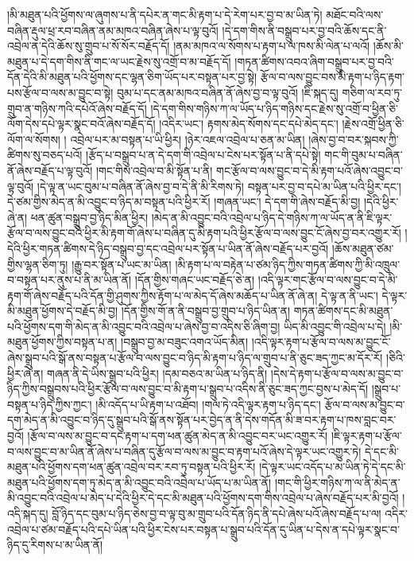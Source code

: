 །མི་མཐུན་པའི་ཕྱོགས་ལ་ཞུགས་པ་ནི་དཔེར་ན་གང་མི་རྟག་པ་དེ་རེག་པར་བྱ་བ་མ་ཡིན་ཏེ། མཐོང་བའི་ལས་བཞིན་རྡུལ་ཕྲ་རབ་བཞིན་ནམ་མཁའ་བཞིན་ཞེས་པ་ལྟ་བུའོ། །དེ་དག་གིས་ནི་བསྒྲུབ་པར་བྱ་བའི་ཆོས་དང་ནི་འབྲེལ་ན་དེའི་ཆོས་སུ་གྲུབ་པ་སོ་སོར་བརྗོད་དོ། །ནམ་མཁའ་ལ་སོགས་པ་རྟག་པ་ལ་ཁས་མི་ལེན་པ་ལའོ། །ཆོས་མི་མཐུན་པ་དེ་དག་གིས་ནི་གང་ལ་ཡང་རྗེས་སུ་འགྲོ་བ་མ་བརྗོད་དོ། །གཏན་ཚིགས་འབའ་ཞིག་བསྒྲུབ་པར་བྱ་བའི་དོན་དེའི་མི་མཐུན་པའི་ཕྱོགས་དང་ལྷན་ཅིག་ཡོད་པར་བསྟན་པར་བྱ་སྟེ། རྩོལ་བ་ལས་བྱུང་བས་མི་རྟག་པ་ཉིད་རྟག་པས་རྩོལ་བ་ལས་མ་བྱུང་བ་སྟེ། བུམ་པ་དང་ནམ་མཁའ་བཞིན་ནོ་ཞེས་བྱ་བ་ལྟ་བུའོ། །ཇི་སྐད་དུ། གཅིག་ལ་རབ་ཏུ་གྲུབ་ན་གཉིས་ཀའི་དཔེའོ་ཞེས་བརྗོད་དོ། །དེ་དག་གིས་གཉིས་ཀ་ལ་ཡོད་པ་ཉིད་གཉིས་དང་རྗེས་སུ་འགྲོ་བ་ཕྱིན་ཅི་ལོག་དེས་དཔེ་ལྟར་སྣང་བའོ་ཞེས་བརྗོད་དོ། །འདིར་ཡང་། རྟགས་མེད་སོགས་དང་དཔེ་མེད་དང་། །རྗེས་འགྲོ་ཕྱིན་ཅི་ལོག་ལ་སོགས། །
འབྲེལ་པར་མ་བསྟན་པ་ཡི་ཕྱིར། །ཉེར་འཇལ་འབྲེལ་པ་ཅན་མ་ཡིན། །ཞེས་བྱ་བ་བར་སྐབས་ཀྱི་ཚིགས་སུ་བཅད་པའོ། །རྩོད་པ་བསྒྲུབ་པ་ན་དེ་དག་གི་འབྲེལ་པ་ངེས་པར་སྟོན་པ་ནི་དཔེ་སྟེ། གང་གི་བུམ་པ་བཞིན་ནོ་ཞེས་བརྗོད་པ་ལྟ་བུའོ། །གང་གིས་འབྲེལ་བ་མི་སྟོན་པ་ནི། གང་རྩོལ་བ་ལས་བྱུང་བ་དེ་མི་རྟག་པའོ་ཞེས་འབྱུང་བ་ལྟ་བུའོ། །དེ་ལྟ་ན་ཡང་བུམ་པ་བཞིན་ནོ་ཞེས་བྱ་བ་དེ་ནི་མི་རིགས་ཏེ། བསྟན་པར་བྱ་བ་དཔེ་མ་ཡིན་པའི་ཕྱིར་དང་། དེ་ཙམ་གྱིས་མེད་ན་མི་འབྱུང་བ་ཉིད་མ་བསྟན་པའི་ཕྱིར་རོ། །གཞན་ཡང་། དེ་དག་གི་ཞེས་བརྗོད་མི་བྱ། །དེའི་ཕྱིར་ཞེ་ན། ཕན་ཚུན་བསྒྲུབ་བྱ་ཉིད་མིན་ཕྱིར། །མེད་ན་མི་འབྱུང་བའི་འབྲེལ་པ་ཉིད་དེ་གཉིས་ཀ་ལ་ཡོད་ན་ནི་ཇི་ལྟར་རྩོལ་བ་ལས་བྱུང་བའི་ཕྱིར་མི་རྟག་གོ་ཞེས་པ་བཞིན་དུ་མི་རྟག་པའི་ཕྱིར་རྩོལ་བ་ལས་བྱུང་ངོ་ཞེས་བྱ་བར་འགྱུར་རོ། །དེའི་ཕྱིར་གཏན་ཚིགས་དེ་ཉིད་བསྒྲུབ་བྱ་དང་འབྲེལ་པར་སྟོན་པ་ཡིན་ནོ་ཞེས་བརྗོད་པར་བྱའོ། །ཆོས་མཐུན་ཙམ་གྱིས་ལྷན་ཅིག་ཏུ། །རྒྱུ་བར་སྟོན་པ་ཡང་མ་ཡིན། །མི་རྟག་པ་ལ་བརྟེན་པ་ཙམ་ཉིད་ཀྱིས་གཏན་ཚིགས་ཀྱི་མི་འཁྲུལ་བ་བསྟན་པར་ནུས་པ་ནི་མ་ཡིན་ནོ། །དོན་གྱིས་གཞང་ཡང་བརྗོད་ཅེ་ན། །འདི་ལྟར་གང་རྩོལ་བ་ལས་བྱུང་བ་དེ་མི་རྟག་གོ་ཞེས་བརྗོད་པའི་དོན་གྱི་ཤུགས་ཀྱིས་རྟོག་པ་ལ་མེད་དོ་ཞེས་མཆོད་པ་ཡིན་ནོ་ཞེ་ན། དེ་ལྟ་ན་ནི་ཡང་། དེ་ལྟར་མི་མཐུན་ཕྱོགས་དེ་བརྗོད་མི་བྱ། །དོན་གྱིས་གོ་ན་ནི་བསྒྲུབ་བྱ་གྲུབ་པ་ཉིད་ཡིན་ན། གཏན་ཚིགས་དང་མི་མཐུན་པའི་ཕྱོགས་དག་གི་མེད་ན་མི་འབྱུང་བའི་འབྲེལ་པ་ཞེས་བྱ་བ་འདིས་ཅི་ཞིག་བྱ། ཡིད་མི་འབྱུང་གི་འབྲེལ་པ་དེ། །མི་མཐུན་ཕྱོགས་ཀྱིས་བསྟན་པ་ན། །བསྒྲུབ་བྱ་མ་བཟུང་འགའ་ཡོད་མིན། །འདི་ལྟར་རྟག་པ་རྩོལ་བ་ལས་མ་བྱུང་ངོ་ཞེས་སྒྲུབ་པའི་སྒོ་ནས་བསྟན་པ་རྩོལ་བ་ལས་བྱུང་བ་ཉིད་མི་རྟག་པ་ཉིད་ལ་གྲུབ་པ་ནི་ཅུང་ཟད་ཀྱང་མ་དོར་རོ། །ཅིའི་ཕྱིར་ཞེ་ན། གཞན་ནི་དེ་ཡིས་སྒྲུབ་པའི་ཕྱིར། །དམ་བཅའ་མ་ཡིན་པ་ཉིད་ནི། །དེས་དེ་རྟག་པ་རྩོལ་བ་ལས་མ་བྱུང་བ་ཉིད་ཀྱིས་བསྒྲུབས་པའི་ཕྱིར་རྩོལ་བ་ལས་བྱུང་བ་མི་རྟག་པ་སྒྲུབ་པ་འདིས་ནི་ཅུང་ཟད་ཀྱང་བྱས་པ་མེད་དོ། །སྒྲུབ་པ་བསྟན་པ་ཉིད་ཀྱིས་ཀྱང་། །མི་འདོད་པ་ཡི་རྟག་པ་འཐོབ། །གལ་ཏེ་འདི་ལྟར་རྟག་པ་ཉིད་དང་། རྩོལ་བ་ལས་མ་བྱུང་བ་དག་མེད་ན་མི་འབྱུང་བ་ཉིད་དུ་སྒྲུབ་པའི་སྒོ་ནས་སྟོན་པར་བྱེད་ན་ནི་དེས་གདོན་མི་ཟ་བར་རྟག་པ་ཁས་བླང་བར་བྱའོ། །རྩོལ་བ་ལས་མ་བྱུང་བ་དང་རྟག་པ་དག་ཕན་ཚུན་མེད་ན་མི་འབྱུང་བར་ཡང་འགྱུར་རོ། །ཇི་ལྟར་རྟག་པ་རྩོལ་བ་ལས་བྱུང་བ་མ་ཡིན་ནོ་ཞེས་པ་བཞིན་དུ་རྩོལ་བ་ལས་མ་བྱུང་བ་རྟག་པའོ་ཞེས་དེ་ལྟར་ཡང་འགྱུར་ཏེ། དེ་དང་མི་མཐུན་པའི་ཕྱོགས་དག་ཕན་ཚུན་འབྲེལ་བར་རབ་ཏུ་བསྟན་པའི་ཕྱིར་རོ། །དེ་ལྟར་ཡང་འདོད་པ་མ་ཡིན་ཏེ་དེ་དང་མི་མཐུན་པའི་ཕྱོགས་དག་ཏུ་མེད་ན་མི་འབྱུང་བའི་འབྲེལ་པ་ཡོད་པ་མ་ཡིན་ནོ། །གང་གི་ཕྱིར་གཉིས་ཀ་ལ་ནི་མེད་ན་མི་འབྱུང་བའི་འབྲེལ་པ་མེད་པ་དེའི་ཕྱིར་དེ་དང་མི་མཐུན་པའི་ཕྱོགས་དག་གིས་འབྲེལ་པ་ཞེས་བརྗོད་པར་མི་བྱའོ། །འདི་སྐད་དུ། བློ་ཉིད་དང་བུམ་པ་ཉིད་ཅེས་བྱ་བ་ལྟ་བུ་མ་གྲུབ་པའི་དོན་ཉིད་ནི་དཔེ་ཞེས་པའོ་ཞེས་བརྗོད་པ་ལ། འདིར་འབྲེལ་པ་ཙམ་བརྗོད་པའི་དཔེ་ཡིན་པའི་ཕྱིར་ངེས་པར་བསྟན་པ་སྒྲུབ་པའི་དོན་དུ་ཡིན་པ་དེས་ན་དཔེ་ལྟར་སྣང་བ་ཉིད་དུ་རིགས་པ་མ་ཡིན་ནོ། 